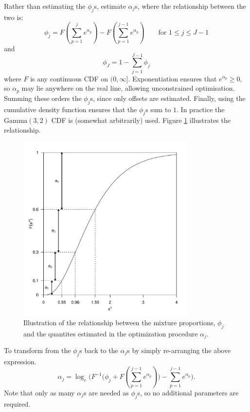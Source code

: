 \label{cor-8s8}Rather than estimating the $\phi_j$s, estimate $\alpha_j$s, where the relationship between the two is:
\begin{equation*}
\phi_j = F(\sum_{p=1}^j e^{\alpha_p}) - F(\sum_{p=1}^{j-1} e^{\alpha_p}) \qquad \text{for } 1\leq j \leq J-1
\end{equation*}
and
\begin{equation*}
\phi_J = 1-\sum_{j=1}^{J-1} \phi_j
\end{equation*}
where $F$ is any continuous CDF on $(0,\infty]$. Exponentiation ensures that $e^{\alpha_p}\geq0$, so $\alpha_p$ may lie anywhere on the real line, allowing unconstrained optimisation. Summing these orders the $\phi_j$s, since only offsets are estimated. Finally, using the cumulative density function ensures that the $\phi_j$s sum to $1$. In practice the $\text{Gamma}(3,2)$ CDF is (somewhat arbitrarily) used. Figure \ref{mmds-phifig} illustrates the relationship.

\begin{figure}
\centering
\includegraphics[width=3.5in]{mix/figs/phidia.pdf}
\caption{Illustration of the relationship between the mixture proportions, $\phi_j$ and the quantites estimated in the optimization procedure $\alpha_j$.}
\label{mmds-phifig}
\end{figure}

To transform from the $\phi_j$s back to the $\alpha_j$s by simply re-arranging the above expression.
\begin{equation*}
\alpha_j = \log_e \Big(F^{-1}\Big(\phi_j + F(\sum_{p=1}^{j-1} e^{\alpha_p})\Big) - \sum_{p=1}^{j-1} e^{\alpha_p}\Big).
\end{equation*}
Note that only as many $\alpha_j$s are needed as $\phi_j$s, so no additional parameters are required.

